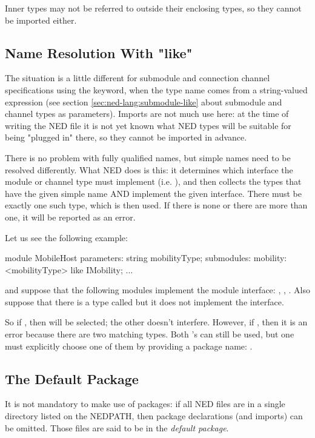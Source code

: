 Inner types may not be referred to outside their enclosing types, so they
cannot be imported either.


\subsection{Name Resolution With "like"}
\label{sec:ned-lang:name-resolution-with-like}

The situation is a little different for submodule and connection channel
specifications using the  keyword, when the type name comes
from a string-valued expression (see section
\ref{sec:ned-lang:submodule-like} about submodule and channel types as
parameters). Imports are not much use here: at the time of writing the NED
file it is not yet known what NED types will be suitable for being "plugged
in" there, so they cannot be imported in advance.

There is no problem with fully qualified names, but simple names need
to be resolved differently. What NED does is this: it determines which
interface the module or channel type must implement (i.e. ),
and then collects the types that have the given simple name AND implement
the given interface. There must be exactly one such type, which is then used.
If there is none or there are more than one, it will be reported as an error.

Let us see the following example:

\begin{ned}
module MobileHost
{
    parameters:
        string mobilityType;
    submodules:
        mobility: <mobilityType> like IMobility;
        ...
}
\end{ned}

and suppose that the following modules implement the  module
interface: , ,
. Also suppose that there is a type
called  but it does not implement the
interface.

So if , then
 will be selected; the other
 doesn't interfere. However, if
, then it is an error because there are two
matching  types. Both 's can still be used,
but one must explicitly choose one of them by providing a package name:
.


\subsection{The Default Package}
\label{sec:ned-lang:default-package}

It is not mandatory to make use of packages: if all NED files are in a
single directory listed on the NEDPATH, then package declarations (and
imports) can be omitted. Those files are said to be in the \textit{default
package}.






